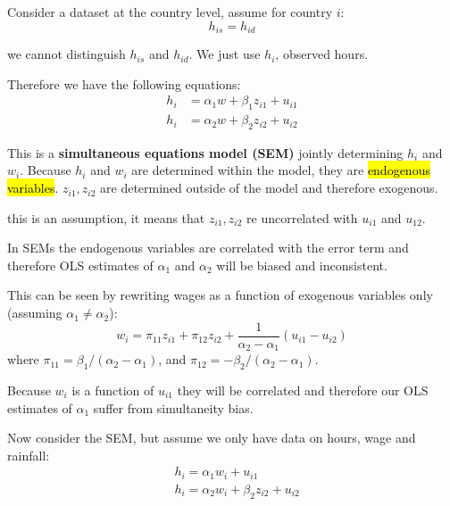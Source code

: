 \documentclass[11pt]{article}
\begin{document}
Consider a dataset at the country level, assume for country $i$:
\[h_{is} = h_{id}\]
\begin{note}
    we cannot distinguish $h_{is}$ and $h_{id}$. We just use $h_i$, observed hours.
\end{note}

Therefore we have the following equations:
\begin{equation}
\label{SEM 1}
    \begin{aligned}
        h_i &= \alpha_1 w + \beta_1 z_{i1} + u_{i1} \\
        h_i &= \alpha_2 w + \beta_2 z_{i2} + u_{i2}
    \end{aligned}
\end{equation}

This is a \textbf{simultaneous equations model (SEM)} jointly determining $h_i$ and $w_i$. Because $h_i$ and $w_i$ are determined within the model, they are \hl{endogenous variables}. $z_{i1},z_{i2}$ are determined outside of the model and therefore exogenous.
\begin{note}
    this is an assumption, it means that $z_{i1},z_{i2}$ re uncorrelated with $u_{i1}$ and $u_{12}$.
\end{note}

In SEMs the endogenous variables are correlated with the error term and therefore OLS estimates of $\alpha_1$ and $\alpha_2$ will be biased and inconsistent. 
\begin{note}
    This can be seen by rewriting wages as a function of exogenous variables only (assuming $\alpha_1 \neq \alpha_2$):
    \begin{equation}
w_i=\pi_{11} z_{i 1}+\pi_{12} z_{i 2}+\frac{1}{\alpha_2-\alpha_1}\left(u_{i 1}-u_{i 2}\right)
\end{equation}
where $\pi_{11} = \beta_1 / (\alpha_2 - \alpha_1)$, and $\pi_{12} = -\beta_2 / (\alpha_2 - \alpha_1)$.

Because $w_i$ is a function of $u_{i1}$ they will be correlated and therefore our OLS estimates of $\alpha_1$ suffer from simultaneity bias.
\end{note}

Now consider the SEM, but assume we only have data on hours, wage and rainfall:
\begin{equation}
\label{SEM 2 only rain}
\begin{aligned}
& h_i=\alpha_1 w_i+u_{i 1} \\
& h_i=\alpha_2 w_i+\beta_2 z_{i 2}+u_{i 2}
\end{aligned}
\end{equation}
\end{document}
